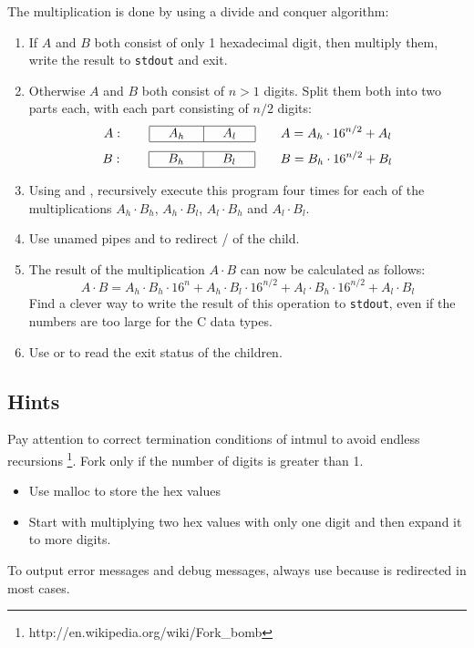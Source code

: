 The multiplication is done by using a divide and conquer algorithm:
\begin{enumerate}
\item If $A$ and $B$ both consist of only 1 hexadecimal digit, then multiply them,
write the result to \texttt{stdout} and exit.
\item Otherwise $A$ and $B$ both consist of $n>1$ digits. Split them both into two parts each,
with each part consisting of $n/2$ digits:
\renewcommand{\arraystretch}{1.3}
\[
A:\quad\quad\begin{array}{|c|c|}\hline \quad A_h \quad & \quad A_l \quad \\\hline\end{array}\quad\quad A=A_h\cdot 16^{n/2}+A_l
\]
\[
B:\quad\quad\begin{array}{|c|c|}\hline \quad B_h \quad & \quad B_l \quad \\\hline\end{array}\quad\quad B=B_h\cdot 16^{n/2}+B_l
\]
\item Using  and , recursively execute this program four times for each of the
multiplications $A_h\cdot B_h$, $A_h\cdot B_l$, $A_l\cdot B_h$ and  $A_l\cdot B_l$.
\item  Use unamed pipes and  to redirect / of the child.
\item The result of the multiplication $A\cdot B$ can now be calculated as follows:
\[
A\cdot B=A_h\cdot B_h\cdot 16^n + A_h\cdot B_l\cdot 16^{n/2} + A_l\cdot B_h\cdot 16^{n/2} + A_l\cdot B_l
\]
Find a clever way to write the result of this operation to \texttt{stdout},
even if the numbers are too large for the C data types.

\item Use  or  to read the exit status of the children.

\end{enumerate}

\subsection*{Hints}

Pay attention to correct termination conditions of intmul to avoid endless recursions \footnote{http://en.wikipedia.org/wiki/Fork\_bomb}.
Fork only if the number of digits is greater than 1.


\begin{itemize}
	\item Use malloc to store the hex values
	\item Start with multiplying two hex values with only one digit and then expand it to more digits. 
\end{itemize}
To output error messages and debug messages, always use
 because  is redirected in most cases.

\osueguidelinestwo


